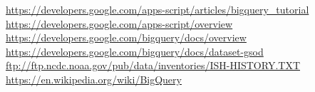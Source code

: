 \renewcommand{\refname}{Quellenverzeichnis}
\def\UrlFont{\bfseries}
\nocite{*}
\begin{thebibliography}{99}
	 \url{https://developers.google.com/apps-script/articles/bigquery_tutorial}
	 \url{https://developers.google.com/apps-script/overview}
	 \url{https://developers.google.com/bigquery/docs/overview}
	 \url{https://developers.google.com/bigquery/docs/dataset-gsod}
	 \url{ftp://ftp.ncdc.noaa.gov/pub/data/inventories/ISH-HISTORY.TXT}
	 \url{https://en.wikipedia.org/wiki/BigQuery}

\end{thebibliography}
